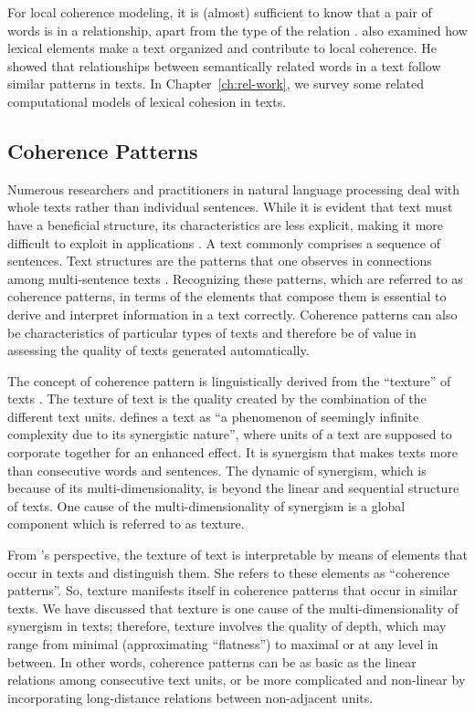 For local coherence modeling, it is (almost) sufficient to know that a pair of words is in a relationship, apart from the type of the relation \cite{halliday76}. %
 also examined how lexical elements make a text organized and contribute to local coherence. 
He showed that relationships between semantically related words in a text follow similar patterns in texts. 
In Chapter~\ref{ch:rel-work}, we survey some related computational models of lexical cohesion in texts.  

\subsection{Coherence Patterns}

Numerous researchers and practitioners in natural language processing deal with whole texts rather than individual sentences. 
While it is evident that text must have a beneficial structure, its characteristics are less explicit, making it more difficult to exploit in applications \cite{webber12a}. 
A text commonly comprises a sequence of sentences. 
Text structures are the patterns that one observes in connections among multi-sentence texts \cite{webber12a}. 
Recognizing these patterns, which are referred to as coherence patterns, in terms of the elements that compose them is essential to derive and interpret information in a text correctly. 
Coherence patterns can also be characteristics of particular types of texts and therefore be of value in assessing the quality of texts generated automatically. 

The concept of coherence pattern is linguistically derived from the ``texture'' of texts \cite{halliday76}.  
The texture of text is the quality created by the combination of the different text units.  
 defines a text as ``a phenomenon of seemingly infinite complexity due to its synergistic nature'', where units of a text are supposed to corporate together for an enhanced effect. 
It is synergism that makes texts more than consecutive words and sentences. 
The dynamic of synergism, which is because of its multi-dimensionality, is beyond the linear and sequential structure of texts. 
One cause of the multi-dimensionality of synergism is a global component which is referred to as texture. 

From 's perspective, the texture of text is interpretable by means of elements that occur in texts and distinguish them.   
She refers to these elements as ``coherence patterns''.   
So, texture manifests itself in coherence patterns that occur in similar texts. 
We have discussed that texture is one cause of the multi-dimensionality of synergism in texts; therefore, texture involves the quality of depth, which may range from minimal (approximating ``flatness'') to maximal or at any level in between. 
In other words, coherence patterns can be as basic as the linear relations among consecutive text units, or be more complicated and non-linear by incorporating long-distance relations between non-adjacent units. 

